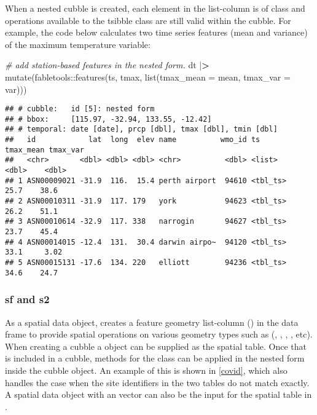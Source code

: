 \documentclass{article}
\newenvironment{Shaded}{\begin{snugshade}}{\end{snugshade}}
\newcommand{\AttributeTok}[1]{\textcolor[rgb]{0.77,0.63,0.00}{#1}}
\newcommand{\CommentTok}[1]{\textcolor[rgb]{0.56,0.35,0.01}{\textit{#1}}}
\newcommand{\ErrorTok}[1]{\textcolor[rgb]{0.64,0.00,0.00}{\textbf{#1}}}
\newcommand{\FunctionTok}[1]{\textcolor[rgb]{0.00,0.00,0.00}{#1}}
\newcommand{\NormalTok}[1]{#1}
\newcommand{\SpecialCharTok}[1]{\textcolor[rgb]{0.00,0.00,0.00}{#1}}
\begin{document}
When a nested cubble is created, each element in the list-column  is of  class and operations available to the tsibble class are still valid within the cubble. For example, the code below calculates two time series features (mean and variance) of the maximum temperature variable:

\begin{Shaded}
\begin{Highlighting}[]
\CommentTok{\# add station{-}based features in the nested form.}
\NormalTok{dt }\SpecialCharTok{|}\ErrorTok{\textgreater{}} \FunctionTok{mutate}\NormalTok{(fabletools}\SpecialCharTok{::}\FunctionTok{features}\NormalTok{(ts, tmax, }\FunctionTok{list}\NormalTok{(}\AttributeTok{tmax\_mean =}\NormalTok{ mean, }\AttributeTok{tmax\_var =}\NormalTok{ var)))}
\end{Highlighting}
\end{Shaded}

\begin{verbatim}
## # cubble:   id [5]: nested form
## # bbox:     [115.97, -32.94, 133.55, -12.42]
## # temporal: date [date], prcp [dbl], tmax [dbl], tmin [dbl]
##   id            lat  long  elev name          wmo_id ts       tmax_mean tmax_var
##   <chr>       <dbl> <dbl> <dbl> <chr>          <dbl> <list>       <dbl>    <dbl>
## 1 ASN00009021 -31.9  116.  15.4 perth airport  94610 <tbl_ts>      25.7    38.6 
## 2 ASN00010311 -31.9  117. 179   york           94623 <tbl_ts>      26.2    51.1 
## 3 ASN00010614 -32.9  117. 338   narrogin       94627 <tbl_ts>      23.7    45.4 
## 4 ASN00014015 -12.4  131.  30.4 darwin airpo~  94120 <tbl_ts>      33.1     3.02
## 5 ASN00015131 -17.6  134. 220   elliott        94236 <tbl_ts>      34.6    24.7
\end{verbatim}

\hypertarget{sf-and-s2}{%
\subsubsection{sf and s2}\label{sf-and-s2}}

As a spatial data object,  creates a feature geometry list-column () in the data frame to provide spatial operations on various geometry types such as (, , , , etc). When creating a cubble a  object can be supplied as the spatial table. Once that is included in a cubble, methods for the  class can be applied in the nested form inside the cubble object. An example of this is shown in \ref{covid}, which also handles the case when the site identifiers in the two tables do not match exactly. A spatial data object with an  vector can also be the input for the spatial table in .
\end{document}
